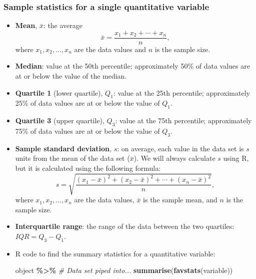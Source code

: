 \documentclass[
]{report}
\newenvironment{Shaded}{\begin{snugshade}}{\end{snugshade}}
\newcommand{\CommentTok}[1]{\textcolor[rgb]{0.56,0.35,0.01}{\textit{#1}}}
\newcommand{\FunctionTok}[1]{\textcolor[rgb]{0.13,0.29,0.53}{\textbf{#1}}}
\newcommand{\NormalTok}[1]{#1}
\newcommand{\SpecialCharTok}[1]{\textcolor[rgb]{0.81,0.36,0.00}{\textbf{#1}}}
\providecommand{\tightlist}{%
  \setlength{\itemsep}{0pt}\setlength{\parskip}{0pt}}
\begin{document}
\subsubsection*{Sample statistics for a single quantitative variable}\label{sample-statistics-for-a-single-quantitative-variable}

\begin{itemize}
\item
  \textbf{Mean}, \(\bar{x}\): the average
  \[ 
  \bar{x} = \frac{x_1 + x_2 + \cdots + x_n}{n},
  \]
  where \(x_1, x_2, \ldots, x_n\) are the data values and \(n\) is the sample size.
\item
  \textbf{Median}: value at the 50th percentile; approximately 50\% of data values are at or below the value of the median.
\end{itemize}

\vspace{1mm}

\begin{itemize}
\tightlist
\item
  \textbf{Quartile 1} (lower quartile), \(Q_1\): value at the 25th percentile; approximately 25\% of data values are at or below the value of \(Q_1\).
\end{itemize}

\vspace{1mm}

\begin{itemize}
\tightlist
\item
  \textbf{Quartile 3} (upper quartile), \(Q_3\): value at the 75th percentile; approximately 75\% of data values are at or below the value of \(Q_3\).
\end{itemize}

\newpage

\begin{itemize}
\item
  \textbf{Sample standard deviation}, \(s\): on average, each value in the data set is \(s\) units from the mean of the data set (\(\bar{x}\)). We will always calculate \(s\) using R, but it is calculated using the following formula:
  \[
  s = \sqrt{\frac{(x_1-\bar{x})^2 + (x_2-\bar{x})^2 + \cdots + (x_n-\bar{x})^2}{n}},
  \]
  where \(x_1, x_2, \ldots, x_n\) are the data values, \(\bar{x}\) is the sample mean, and \(n\) is the sample size.
\item
  \textbf{Interquartile range}: the range of the data between the two quartiles: \(IQR = Q_3-Q_1\).
\item
  R code to find the summary statistics for a quantitative variable:

\begin{Shaded}
\begin{Highlighting}[]
\NormalTok{object }\SpecialCharTok{\%\textgreater{}\%} \CommentTok{\# Data set piped into...}
    \FunctionTok{summarise}\NormalTok{(}\FunctionTok{favstats}\NormalTok{(variable))}
\end{Highlighting}
\end{Shaded}
\end{itemize}
\end{document}
